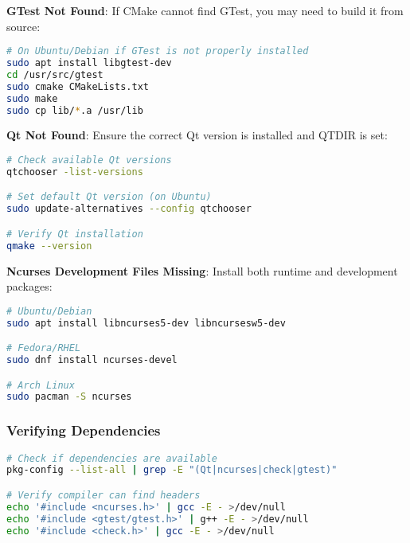 \documentclass[12pt]{article}
\begin{document}
\begin{warningbox}
\textbf{GTest Not Found}: If CMake cannot find GTest, you may need to build it from source:
\end{warningbox}

\begin{lstlisting}[language=bash]
# On Ubuntu/Debian if GTest is not properly installed
sudo apt install libgtest-dev
cd /usr/src/gtest
sudo cmake CMakeLists.txt
sudo make
sudo cp lib/*.a /usr/lib
\end{lstlisting}

\begin{warningbox}
\textbf{Qt Not Found}: Ensure the correct Qt version is installed and QTDIR is set:
\end{warningbox}

\begin{lstlisting}[language=bash]
# Check available Qt versions
qtchooser -list-versions

# Set default Qt version (on Ubuntu)
sudo update-alternatives --config qtchooser

# Verify Qt installation
qmake --version
\end{lstlisting}

\begin{warningbox}
\textbf{Ncurses Development Files Missing}: Install both runtime and development packages:
\end{warningbox}

\begin{lstlisting}[language=bash]
# Ubuntu/Debian
sudo apt install libncurses5-dev libncursesw5-dev

# Fedora/RHEL
sudo dnf install ncurses-devel

# Arch Linux
sudo pacman -S ncurses
\end{lstlisting}

\subsubsection{Verifying Dependencies}
\begin{lstlisting}[language=bash]
# Check if dependencies are available
pkg-config --list-all | grep -E "(Qt|ncurses|check|gtest)"

# Verify compiler can find headers
echo '#include <ncurses.h>' | gcc -E - >/dev/null
echo '#include <gtest/gtest.h>' | g++ -E - >/dev/null
echo '#include <check.h>' | gcc -E - >/dev/null
\end{lstlisting}
\end{document}
